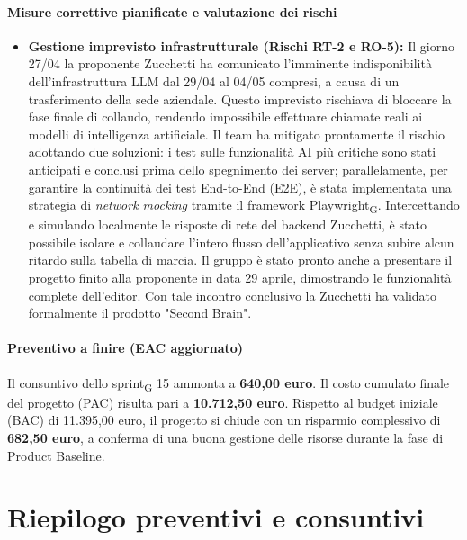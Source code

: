 \documentclass[11pt,a4paper]{article}
\newcommand{\gls}[1]{#1\textsubscript{G}}
\begin{document}
\paragraph{Misure correttive pianificate e valutazione dei rischi}
\begin{itemize}
    \item \textbf{Gestione imprevisto infrastrutturale (Rischi RT-2 e RO-5):} Il giorno 27/04 la proponente Zucchetti ha comunicato l'imminente indisponibilità dell'infrastruttura LLM dal 29/04 al 04/05 compresi, a causa di un trasferimento della sede aziendale. Questo imprevisto rischiava di bloccare la fase finale di collaudo, rendendo impossibile effettuare chiamate reali ai modelli di intelligenza artificiale. Il team ha mitigato prontamente il rischio adottando due soluzioni: i test sulle funzionalità AI più critiche sono stati anticipati e conclusi prima dello spegnimento dei server; parallelamente, per garantire la continuità dei test End-to-End (E2E), è stata implementata una strategia di \textit{network mocking} tramite il framework \gls{Playwright}. Intercettando e simulando localmente le risposte di rete del backend Zucchetti, è stato possibile isolare e collaudare l'intero flusso dell'applicativo senza subire alcun ritardo sulla tabella di marcia. Il gruppo è stato pronto anche a presentare il progetto finito alla proponente in data 29 aprile, dimostrando le funzionalità complete dell'editor. Con tale incontro conclusivo la Zucchetti ha validato formalmente il prodotto "Second Brain".
\end{itemize}

\paragraph{Preventivo a finire (EAC aggiornato)}
Il consuntivo dello \gls{sprint} 15 ammonta a \textbf{640,00 euro}.
Il costo cumulato finale del progetto (PAC) risulta pari a \textbf{10.712,50 euro}. 
Rispetto al budget iniziale (BAC) di 11.395,00 euro, il progetto si chiude con un risparmio complessivo di \textbf{682,50 euro}, a conferma di una buona gestione delle risorse durante la fase di Product Baseline.


\newpage
\section{Riepilogo preventivi e consuntivi}
\end{document}
